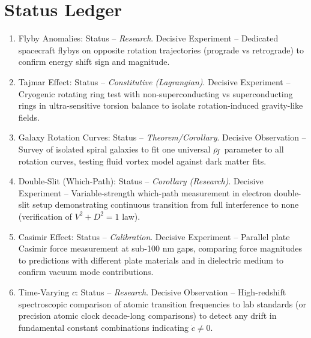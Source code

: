 \documentclass[11pt]{article}
\begin{document}
\section*{Status Ledger}

\begin{enumerate}

\item 
Flyby Anomalies: Status – \textit{Research}. Decisive Experiment – Dedicated spacecraft flybys on opposite rotation trajectories (prograde vs retrograde) to confirm energy shift sign and magnitude.




\item 
Tajmar Effect: Status – \textit{Constitutive (Lagrangian)}. Decisive Experiment – Cryogenic rotating ring test with non-superconducting vs superconducting rings in ultra-sensitive torsion balance to isolate rotation-induced gravity-like fields.




\item 
Galaxy Rotation Curves: Status – \textit{Theorem/Corollary}. Decisive Observation – Survey of isolated spiral galaxies to fit one universal $\rho_{\!f}$ parameter to all rotation curves, testing fluid vortex model against dark matter fits.




\item 
Double-Slit (Which-Path): Status – \textit{Corollary (Research)}. Decisive Experiment – Variable-strength which-path measurement in electron double-slit setup demonstrating continuous transition from full interference to none (verification of $V^2+D^2=1$ law).




\item 
Casimir Effect: Status – \textit{Calibration}. Decisive Experiment – Parallel plate Casimir force measurement at sub-100 nm gaps, comparing force magnitudes to predictions with different plate materials and in dielectric medium to confirm vacuum mode contributions.




\item 
Time-Varying $c$: Status – \textit{Research}. Decisive Observation – High-redshift spectroscopic comparison of atomic transition frequencies to lab standards (or precision atomic clock decade-long comparisons) to detect any drift in fundamental constant combinations indicating $\dot{c} \neq 0$.





\end{enumerate}
\end{document}
